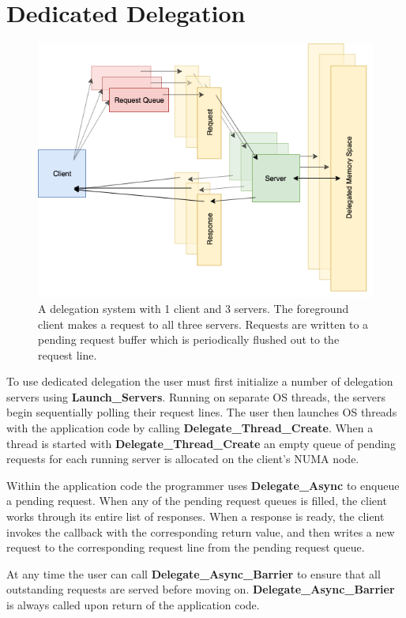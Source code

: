 \documentclass{uicthesi}
\begin{document}
\section{Dedicated Delegation}
\begin{figure}[ht!]
\centering
\includegraphics[width=0.9\columnwidth]{FIG/dedicated_async.png}
\caption{A delegation system with 1 client and 3 servers. The foreground client makes a request to all three servers. Requests are written to a pending request buffer which is periodically flushed out to the request line. }
\label{fig:dedicated_delegation}
\end{figure}

To use dedicated delegation the user must first initialize a number of delegation servers using \textbf{Launch\_Servers}. Running on separate OS threads, the servers begin sequentially polling their request lines. The user then launches OS threads with the application code by calling \textbf{Delegate\_Thread\_Create}. When a thread is started with \textbf{Delegate\_Thread\_Create} an empty queue of pending requests for each running server is allocated on the client's NUMA node. 

Within the application code the programmer uses \textbf{Delegate\_Async} to enqueue a pending request. When any of the pending request queues is filled, the client works through its entire list of responses. When a response is ready, the client invokes the callback with the corresponding return value, and then writes a new request to the corresponding request line from the pending request queue. 

At any time the user can call \textbf{Delegate\_Async\_Barrier} to ensure that all outstanding requests are served before moving on.  \textbf{Delegate\_Async\_Barrier} is always called upon return of the application code. 
\end{document}
